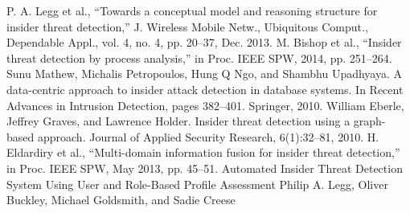 \documentclass[conference]{IEEEtran}
\begin{document}
\begin{thebibliography}{00}
  P. A. Legg et al., “Towards a conceptual model and reasoning structure for insider threat detection,” J. Wireless Mobile Netw., Ubiquitous Comput., Dependable Appl., vol. 4, no. 4, pp. 20–37, Dec. 2013.
 M. Bishop et al., “Insider threat detection by process analysis,” in Proc. IEEE SPW, 2014, pp. 251–264.
 Sunu Mathew, Michalis Petropoulos, Hung Q Ngo, and Shambhu Upadhyaya. A data-centric approach to insider attack detection in database systems. In Recent Advances in Intrusion Detection, pages 382–401. Springer, 2010.
 William Eberle, Jeffrey Graves, and Lawrence Holder. Insider threat detection using a graph-based approach. Journal of Applied Security Research, 6(1):32–81, 2010.
 H. Eldardiry et al., “Multi-domain information fusion for insider threat detection,” in Proc. IEEE SPW, May 2013, pp. 45–51.
Automated Insider Threat Detection System Using User and Role-Based Profile Assessment Philip A. Legg, Oliver Buckley, Michael Goldsmith, and Sadie Creese



\end{thebibliography}
\end{document}
